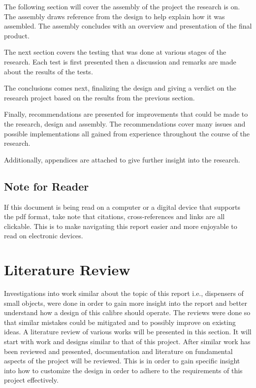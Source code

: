 \documentclass[a4paper,11pt]{article}
\numberwithin{figure}{section}
\numberwithin{table}{section}
\begin{document}
The following section will cover the assembly of the project the research is on. The assembly draws reference from the design to help explain how it was assembled. The assembly concludes with an overview and presentation of the final product.

The next section covers the testing that was done at various stages of the research. Each test is first presented then a discussion and remarks are made about the results of the tests.

The conclusions comes next, finalizing the design and giving a verdict on the research project based on the results from the previous section.

Finally, recommendations are presented for improvements that could be made to the research, design and assembly. The recommendations cover many issues and possible implementations all gained from experience throughout the course of the research.

Additionally, appendices are attached to give further insight into the research.
	\subsection{Note for Reader}
	If this document is being read on a computer or a digital device that supports the pdf format, take note that citations, cross-references and links are all clickable. This is to make navigating this report easier and more enjoyable to read on electronic devices.
	\newpage
\setlength{\parskip}{1em}
\section{Literature Review}\thispagestyle{sectionstart}
Investigations into work similar about the topic of this report i.e., dispensers of small objects, were done in order to gain more insight into the report and better understand how a design of this calibre should operate. The reviews were done so that similar mistakes could be mitigated and to possibly improve on existing ideas. A literature review of various works will be presented in this section. It will start with work and designs similar to that of this project. After similar work has been reviewed and presented, documentation and literature on fundamental aspects of the project will be reviewed. This is in order to gain specific insight into how to customize the design in order to adhere to the requirements of this project effectively. 
\end{document}
